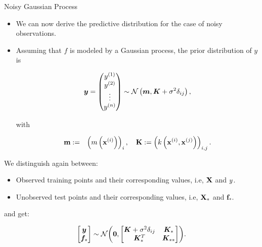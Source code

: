 \begin{frame}[c,allowframebreaks]{Noisy Gaussian Process}
\framebreak

\begin{itemize}
  \item We can now derive the predictive distribution for the case of noisy observations. 
  \item Assuming that $f$ is modeled by a Gaussian process, the prior distribution of $y$ is
  
  $$\bm{y} = \begin{pmatrix} y^{(1)} \\ y^{(2)} \\ \vdots \\ y^{(n)} \end{pmatrix} \sim \mathcal{N}\left(\bm{m}, \bm{K} + \sigma^2 \delta_{ij}\right),$$
  
  with

  \begin{eqnarray*}
    \textbf{m} &:=& \left(m\left(\mathbf{x}^{(i)}\right)\right)_{i}, \quad
    \textbf{K} := \left(k\left(\mathbf{x}^{(i)}, \mathbf{x}^{(j)}\right)\right)_{i,j}. 
  \end{eqnarray*}
\end{itemize}

\framebreak 


We distinguish again between:

\lz

\begin{itemize}
\item Observed training points and their corresponding values, i.e, $\mathbf{X}$ and $y$.
\item Unobserved test points and their corresponding values, i.e, $\mathbf{X}_*$ and $\bm{f}_*$.
\end{itemize}

\lz

and get:
  
  $$
  \begin{bmatrix}
  \bm{y} \\
  \bm{f}_*
  \end{bmatrix} \sim  
  \mathcal{N}\biggl(\bm{0}, \begin{bmatrix} \bm{K} + \sigma^2\delta_{ij} & \bm{K}_* \\ \bm{K}_*^T & \bm{K}_{**} \end{bmatrix}\biggr).
  $$

\framebreak
\begin{itemize}


\end{itemize}
\end{frame}
